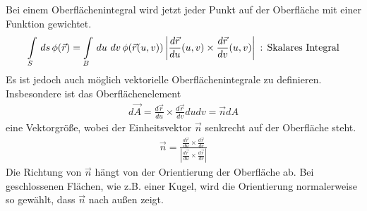 Bei einem Oberflächenintegral wird jetzt jeder Punkt auf der Oberfläche mit
einer Funktion gewichtet.
\begin{align*}
\int \limits_{S} \,ds\, \phi(\vec{r}) = \int \limits_{B} \,du\, \,dv\,
\phi(\vec{r}(u,v)) \left|\frac{d\vec{r}}{du}(u,v) \times
\frac{d\vec{r}}{dv}(u,v)\right| \text{ : Skalares Integral}
\end{align*}
Es ist jedoch auch möglich vektorielle Oberflächenintegrale zu definieren.
Insbesondere ist das Oberflächenelement
\begin{align*}
d\vec{A} = \frac{d\vec{r}}{du} \times
\frac{d\vec{r}}{dv} du dv = \vec{n} dA
\end{align*}
eine Vektorgröße, wobei der Einheitsvektor $\vec{n}$ senkrecht auf der
Oberfläche steht.
\begin{align*}
\vec{n} = \frac{\frac{d\vec{r}}{du} \times
\frac{d\vec{r}}{dv}}{\left| \frac{d\vec{r}}{du} \times
\frac{d\vec{r}}{dv} \right|}
\end{align*}
Die Richtung von $\vec{n}$ hängt von der Orientierung der Oberfläche ab. Bei
geschlossenen Flächen, wie z.B. einer Kugel, wird die Orientierung normalerweise
so gewählt, dass $\vec{n}$ nach außen zeigt.


